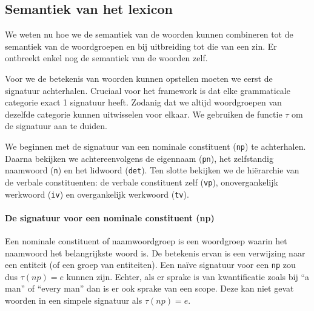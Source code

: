 
\subsection{Semantiek van het lexicon} We weten nu hoe we de semantiek van de woorden kunnen combineren tot de semantiek van de woordgroepen en bij uitbreiding tot die van een zin. Er ontbreekt enkel nog de semantiek van de woorden zelf.

Voor we de betekenis van woorden kunnen opstellen moeten we eerst de signatuur achterhalen. Cruciaal voor het framework is dat elke grammaticale categorie exact 1 signatuur heeft. Zodanig dat we altijd woordgroepen van dezelfde categorie kunnen uitwisselen voor elkaar. We gebruiken de functie $\tau$ om de signatuur aan te duiden.

We beginnen met de signatuur van een nominale constituent (\texttt{np}) te achterhalen. Daarna bekijken we achtereenvolgens de eigennaam (\texttt{pn}), het zelfstandig naamwoord (\texttt{n}) en het lidwoord (\texttt{det}). Ten slotte bekijken we de hiërarchie van de verbale constituenten: de verbale constituent zelf (\texttt{vp}), onovergankelijk werkwoord (\texttt{iv}) en overgankelijk werkwoord (\texttt{tv}).

\paragraph{De signatuur voor een nominale constituent (np)} Een nominale constituent of naamwoordgroep is een woordgroep waarin het naamwoord het belangrijkste woord is. De betekenis ervan is een verwijzing naar een entiteit (of een groep van entiteiten). Een naïve signatuur voor een \texttt{np} zou dus $\tau(np) = e$ kunnen zijn. Echter, als er sprake is van kwantificatie zoals bij ``a man'' of ``every man'' dan is er ook sprake van een scope. Deze kan niet gevat woorden in een simpele signatuur als $\tau(np) = e$.

